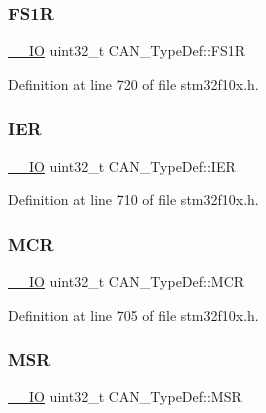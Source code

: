 \subsubsection{\texorpdfstring{F\+S1R}{FS1R}}
{\footnotesize\ttfamily \hyperlink{core__sc300_8h_aec43007d9998a0a0e01faede4133d6be}{\+\_\+\+\_\+\+IO} uint32\+\_\+t C\+A\+N\+\_\+\+Type\+Def\+::\+F\+S1R}



Definition at line 720 of file stm32f10x.\+h.

\mbox{\label{struct_c_a_n___type_def_a530babbc4b9584c93a1bf87d6ce8b8dc}} 
\subsubsection{\texorpdfstring{I\+ER}{IER}}
{\footnotesize\ttfamily \hyperlink{core__sc300_8h_aec43007d9998a0a0e01faede4133d6be}{\+\_\+\+\_\+\+IO} uint32\+\_\+t C\+A\+N\+\_\+\+Type\+Def\+::\+I\+ER}



Definition at line 710 of file stm32f10x.\+h.

\mbox{\label{struct_c_a_n___type_def_a1282eee79a22003257a7a5daa7f4a35f}} 
\subsubsection{\texorpdfstring{M\+CR}{MCR}}
{\footnotesize\ttfamily \hyperlink{core__sc300_8h_aec43007d9998a0a0e01faede4133d6be}{\+\_\+\+\_\+\+IO} uint32\+\_\+t C\+A\+N\+\_\+\+Type\+Def\+::\+M\+CR}



Definition at line 705 of file stm32f10x.\+h.

\mbox{\label{struct_c_a_n___type_def_af98b957a4e887751fbd407d3e2cf93b5}} 
\subsubsection{\texorpdfstring{M\+SR}{MSR}}
{\footnotesize\ttfamily \hyperlink{core__sc300_8h_aec43007d9998a0a0e01faede4133d6be}{\+\_\+\+\_\+\+IO} uint32\+\_\+t C\+A\+N\+\_\+\+Type\+Def\+::\+M\+SR}




